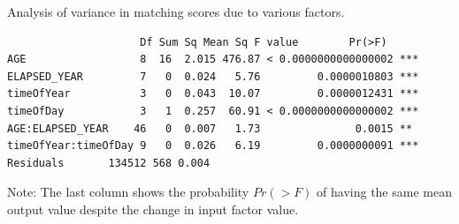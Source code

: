 \documentclass{cta-author}%
\begin{document}
\begin{table}[!b]
\caption{Analysis of variance in matching scores due to various factors. \label{fAOV}}
{
\tiny
\begin{verbatim}
                     Df Sum Sq Mean Sq F value        Pr(>F)   
AGE                  8  16  2.015 476.87 < 0.0000000000000002 ***
ELAPSED_YEAR         7   0  0.024   5.76         0.0000010803 ***
timeOfYear           3   0  0.043  10.07         0.0000012431 ***
timeOfDay            3   1  0.257  60.91 < 0.0000000000000002 ***
AGE:ELAPSED_YEAR    46   0  0.007   1.73               0.0015 **
timeOfYear:timeOfDay 9   0  0.026   6.19         0.0000000091 ***
Residuals       134512 568 0.004                                
\end{verbatim}
}
{\scriptsize
Note: 
The last column shows the probability $Pr(>F)$  of having the same mean output  value despite the change in input factor value. 
}
\end{table}
\end{document}
